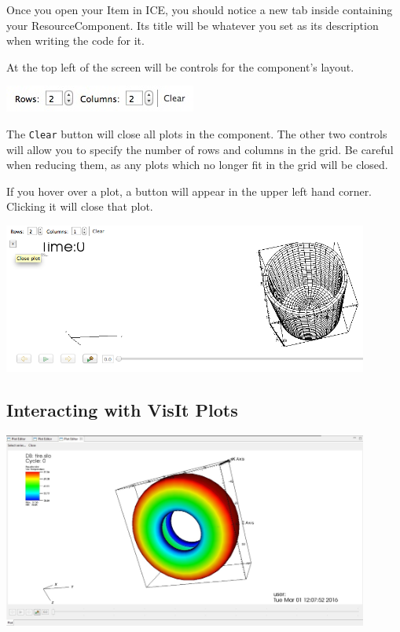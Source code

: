 \documentclass{article}
\begin{document}
Once you open your Item in ICE, you should notice a new tab inside containing
your ResourceComponent. Its title will be whatever you set as its description
when writing the code for it.

At the top left of the screen will be controls for the component's layout.

\begin{center}
\includegraphics{images/ResourceComponentControls}
\end{center}

The \texttt{Clear} button will close all plots in the component. The other two
controls will allow you to specify the number of rows and columns in the grid.
Be careful when reducing them, as any plots which no longer fit in the grid will
be closed.

If you hover over a plot, a button will appear in the upper left hand corner.
Clicking it will close that plot. 

\begin{center}
\includegraphics[width=12cm]{images/ClosePlotButton}
\end{center}

\subsection{Interacting with VisIt Plots}

\begin{center}
\includegraphics[width=12cm]{images/VisItPlot}
\end{center}
\end{document}
